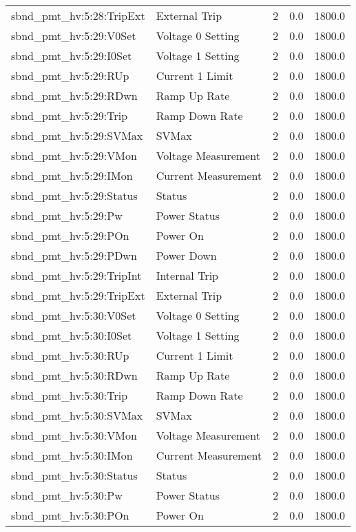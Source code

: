 \begin{center}
\begin{longtable}{l | l l l l }
sbnd\_pmt\_hv:5:28:TripExt & External Trip & 2 & 0.0 & 1800.0\\ 
sbnd\_pmt\_hv:5:29:V0Set & Voltage 0 Setting & 2 & 0.0 & 1800.0\\ 
sbnd\_pmt\_hv:5:29:I0Set & Voltage 1 Setting & 2 & 0.0 & 1800.0\\ 
sbnd\_pmt\_hv:5:29:RUp & Current 1 Limit & 2 & 0.0 & 1800.0\\ 
sbnd\_pmt\_hv:5:29:RDwn & Ramp Up Rate & 2 & 0.0 & 1800.0\\ 
sbnd\_pmt\_hv:5:29:Trip & Ramp Down Rate & 2 & 0.0 & 1800.0\\ 
sbnd\_pmt\_hv:5:29:SVMax & SVMax & 2 & 0.0 & 1800.0\\ 
sbnd\_pmt\_hv:5:29:VMon & Voltage Measurement & 2 & 0.0 & 1800.0\\ 
sbnd\_pmt\_hv:5:29:IMon & Current Measurement & 2 & 0.0 & 1800.0\\ 
sbnd\_pmt\_hv:5:29:Status & Status & 2 & 0.0 & 1800.0\\ 
sbnd\_pmt\_hv:5:29:Pw & Power Status & 2 & 0.0 & 1800.0\\ 
sbnd\_pmt\_hv:5:29:POn & Power On & 2 & 0.0 & 1800.0\\ 
sbnd\_pmt\_hv:5:29:PDwn & Power Down & 2 & 0.0 & 1800.0\\ 
sbnd\_pmt\_hv:5:29:TripInt & Internal Trip & 2 & 0.0 & 1800.0\\ 
sbnd\_pmt\_hv:5:29:TripExt & External Trip & 2 & 0.0 & 1800.0\\ 
sbnd\_pmt\_hv:5:30:V0Set & Voltage 0 Setting & 2 & 0.0 & 1800.0\\ 
sbnd\_pmt\_hv:5:30:I0Set & Voltage 1 Setting & 2 & 0.0 & 1800.0\\ 
sbnd\_pmt\_hv:5:30:RUp & Current 1 Limit & 2 & 0.0 & 1800.0\\ 
sbnd\_pmt\_hv:5:30:RDwn & Ramp Up Rate & 2 & 0.0 & 1800.0\\ 
sbnd\_pmt\_hv:5:30:Trip & Ramp Down Rate & 2 & 0.0 & 1800.0\\ 
sbnd\_pmt\_hv:5:30:SVMax & SVMax & 2 & 0.0 & 1800.0\\ 
sbnd\_pmt\_hv:5:30:VMon & Voltage Measurement & 2 & 0.0 & 1800.0\\ 
sbnd\_pmt\_hv:5:30:IMon & Current Measurement & 2 & 0.0 & 1800.0\\ 
sbnd\_pmt\_hv:5:30:Status & Status & 2 & 0.0 & 1800.0\\ 
sbnd\_pmt\_hv:5:30:Pw & Power Status & 2 & 0.0 & 1800.0\\ 
sbnd\_pmt\_hv:5:30:POn & Power On & 2 & 0.0 & 1800.0\\ 

\end{longtable}
\end{center}
